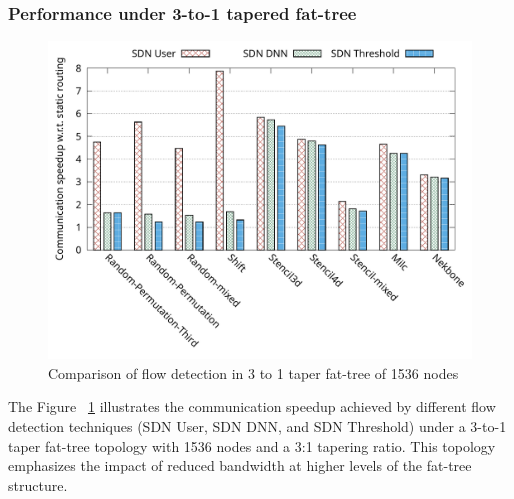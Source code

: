 \subsubsection{Performance under 3-to-1 tapered fat-tree}
\begin{figure}[h]
  \centering
  \includegraphics[width=\columnwidth]{./figs_4/taper_fat_flow_detection.pdf}
  \caption{Comparison of flow detection in 3 to 1 taper fat-tree of 1536 nodes}
  \label{fig:fld_taper}
\end{figure}

The Figure ~\ref{fig:fld_taper} illustrates the communication speedup achieved by different flow detection techniques (SDN User, SDN DNN, and SDN Threshold) under a 3-to-1 taper fat-tree topology with 1536 nodes and a 3:1 tapering ratio. This topology emphasizes the impact of reduced bandwidth at higher levels of the fat-tree structure.



